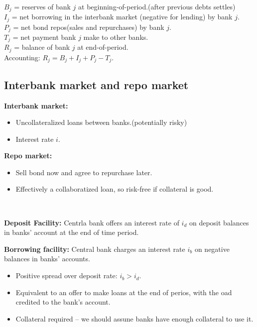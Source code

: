 \begin{note}
    \ 

    $B_j$ = reserves of bank $j$ at beginning-of-period.(after previous debts settles) \\
    $I_j$ = net borrowing in the interbank market (negative for
    lending) by bank $j$. \\
    $P_j$ = net bond repos(sales and repurchases) by bank $j$. \\
    $T_j$ = net payment bank $j$ make to other banks. \\
    $R_j$ = balance of bank $j$ at end-of-period. \\
    Accounting: $R_j = B_j + I_j + P_j - T_j$.
\end{note}

\subsection{Interbank market and repo market}
\textbf{Interbank market:}
\begin{itemize}
    \item Uncollateralized loans between banks.(potentially risky)
    \item Interest rate $i$.
\end{itemize}

\textbf{Repo market:}
\begin{itemize}
    \item Sell bond now and agree to repurchase later.
    \item Effectively a collaboratized loan, so risk-free if collateral is good.
\end{itemize}

\begin{note}
    \ 

    \textbf{Deposit Facility:} Centrla bank offers an interest rate of $i_d$ on deposit balances in banks' account at the end of time period.

    \textbf{Borrowing facility:} Central bank charges an interest rate $i_b$ on negative balances in banks' accounts.
    \begin{itemize}
        \item Positive spread over deposit rate: $i_b > i_d$.
        \item Equivalent to an offer to make loans at the end of perios, with the oad credited to the bank's account.
        \item Collateral required -- we should assune banks have enough collateral to use it.
    \end{itemize}
\end{note}

